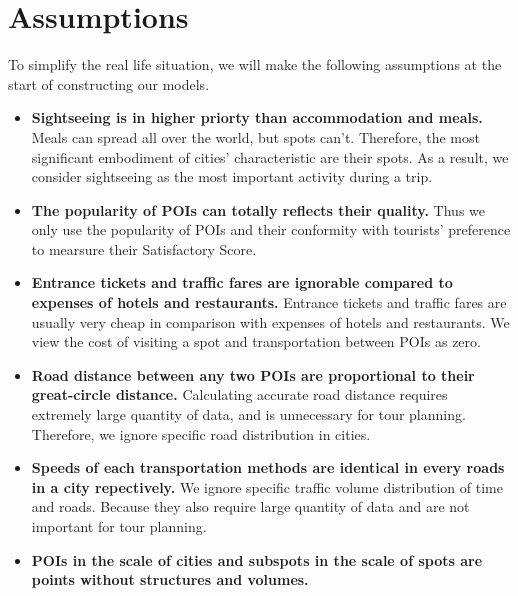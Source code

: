 \documentclass{mcmthesis}
\begin{document}
\section{Assumptions}\label{section:assumption}
  To simplify the real life situation, we will make the following assumptions at the start of constructing our models.
  \begin{itemize}
    \item \textbf{Sightseeing is in higher priorty than accommodation and meals.} Meals can spread all over the world, but spots can't. Therefore, the most significant embodiment of cities' characteristic are their spots. As a result, we consider sightseeing as the most important activity during a trip. 
    \item \textbf{The popularity of POIs can totally reflects their quality.} Thus we only use the popularity of POIs and their conformity with tourists' preference to mearsure their Satisfactory Score.
    \item \textbf{Entrance tickets and traffic fares are ignorable compared to expenses of hotels and restaurants.} Entrance tickets and traffic fares are usually very cheap in comparison with expenses of hotels and restaurants. We view the cost of visiting a spot and transportation between POIs as zero.
    \item \textbf{Road distance between any two POIs are proportional to their great-circle distance.} Calculating accurate road distance requires extremely large quantity of data, and is unnecessary for tour planning. Therefore, we ignore specific road distribution in cities.
    \item \textbf{Speeds of each transportation methods are identical in every roads in a city repectively.} We ignore specific traffic volume distribution of time and roads. Because they also require large quantity of data and are not important for tour planning.
    \item \textbf{POIs in the scale of cities and subspots in the scale of spots are points without structures and volumes.}
  \end{itemize}
\end{document}

